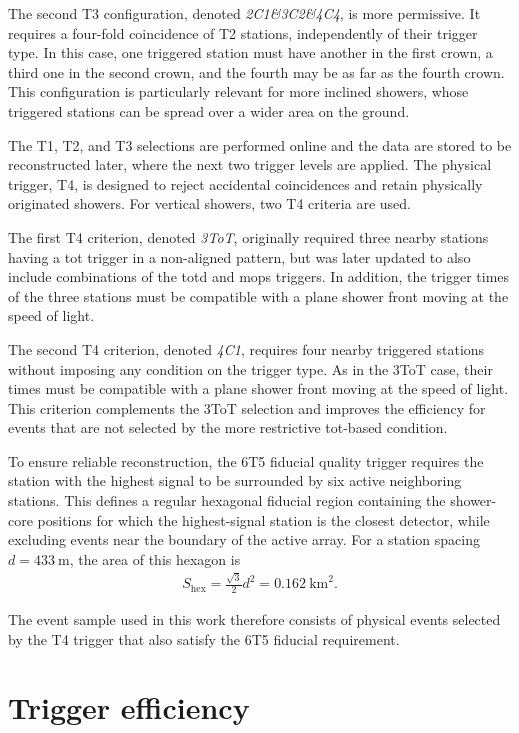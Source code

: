 \documentclass[main.tex]{subfiles}
\begin{document}
The second T3 configuration, denoted \textit{2C1\&3C2\&4C4}, is more permissive.
It requires a four-fold coincidence of T2 stations, independently of their trigger type.
In this case, one triggered station must have another in the first crown, a third one in the second crown, and the fourth may be as far as the fourth crown.
This configuration is particularly relevant for more inclined showers, whose triggered stations can be spread over a wider area on the ground.

The T1, T2, and T3 selections are performed online and the data are stored to be reconstructed later, where the next two trigger levels are applied.
The physical trigger, T4, is designed to reject accidental coincidences and retain physically originated showers.
For vertical showers, two T4 criteria are used.

The first T4 criterion, denoted \textit{3ToT}, originally required three nearby stations having a \gls{tot} trigger in a non-aligned pattern, but was later updated to also include combinations of the \gls{totd} and \gls{mops} triggers.
In addition, the trigger times of the three stations must be compatible with a plane shower front moving at the speed of light.

The second T4 criterion, denoted \textit{4C1}, requires four nearby triggered stations without imposing any condition on the trigger type.
As in the 3ToT case, their times must be compatible with a plane shower front moving at the speed of light.
This criterion complements the 3ToT selection and improves the efficiency for events that are not selected by the more restrictive \gls{tot}-based condition.

To ensure reliable reconstruction, the 6T5 fiducial quality trigger requires the station with the highest signal to be surrounded by six active neighboring stations.
This defines a regular hexagonal fiducial region containing the shower-core positions for which the highest-signal station is the closest detector, while excluding events near the boundary of the active array.
For a station spacing $d=\SI{433}{\m}$, the area of this hexagon is
\begin{align}
    S_{\mathrm{hex}}
    =\frac{\sqrt{3}}{2}d^2
    =\SI{0.162}{\km\squared}.
    \label{eq:6T5_area}
\end{align}

The event sample used in this work therefore consists of physical events selected by the T4 trigger that also satisfy the 6T5 fiducial requirement.

\section{Trigger efficiency}
\label{sec:efficiency}
\end{document}

